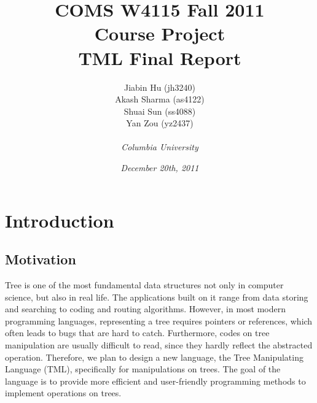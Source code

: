 \documentclass[12pt,psfig,a4]{article}
\begin{document}
 
\pagestyle{plain} 
\newenvironment{code}
{\sffamily
 \setlength{\parskip}{0pt}
}
{}

\title{\vspace{2in}\textbf{
COMS W4115 Fall 2011\\
Course Project\\
TML Final Report}}
\author{
Jiabin Hu (jh3240)\\
Akash Sharma (as4122)\\
Shuai Sun (ss4088)\\
Yan Zou (yz2437)\\\\
\textit{Columbia University}
}
\date{\textit{December 20th, 2011}}
\maketitle

\pagebreak
\tableofcontents





\pagebreak


\section{Introduction}

\subsection{Motivation}
Tree is one of the most fundamental data structures not only in computer science, but also in real life. The applications built on it range from data storing and searching to coding and routing algorithms. However, in most modern programming languages, representing a tree requires pointers or references, which often leads to bugs that are hard to catch. Furthermore, codes on tree manipulation are usually difficult to read, since they hardly reflect the abstracted operation. Therefore, we plan to design a new language, the Tree Manipulating Language (TML), specifically for manipulations on trees. The goal of the language is to provide more efficient and user-friendly programming methods to implement operations on trees.
\end{document}
